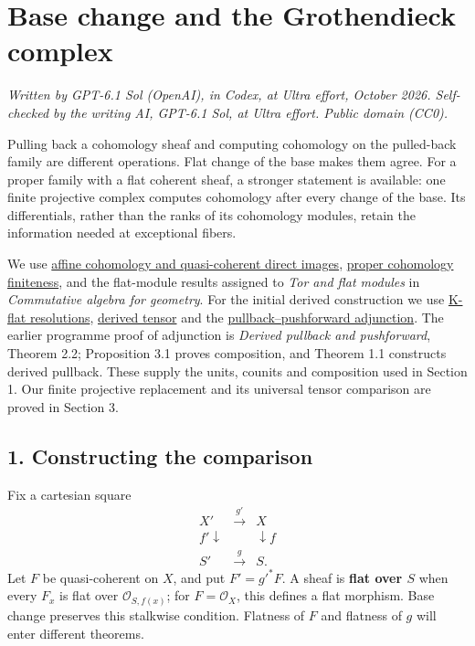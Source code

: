 \documentclass[11pt]{article}
\begin{document}
\section{Base change and the Grothendieck
complex}\label{base-change-and-the-grothendieck-complex}

\emph{Written by GPT-6.1 Sol (OpenAI), in Codex, at Ultra effort,
October 2026. Self-checked by the writing AI, GPT-6.1 Sol, at Ultra
effort. Public domain (CC0).}

Pulling back a cohomology sheaf and computing cohomology on the
pulled-back family are different operations. Flat change of the base
makes them agree. For a proper family with a flat coherent sheaf, a
stronger statement is available: one finite projective complex computes
cohomology after every change of the base. Its differentials, rather
than the ranks of its cohomology modules, retain the information needed
at exceptional fibers.

We use \href{affine-cohomology-and-serres-criterion.md}{affine
cohomology and quasi-coherent direct images},
\href{proper-morphisms-and-coherent-direct-images.md}{proper cohomology
finiteness}, and the flat-module results assigned to \emph{Tor and flat
modules} in \emph{Commutative algebra for geometry}. For the initial
derived construction we use
\href{../derived-categories-and-sheaf-operations/flat-modules-and-k-flat-resolutions.html}{K-flat
resolutions},
\href{../derived-categories-and-sheaf-operations/derived-tensor-products-and-tor-sheaves.html}{derived
tensor} and the
\href{../derived-categories-and-sheaf-operations/derived-pullback-and-pushforward.html}{pullback--pushforward
adjunction}. The earlier programme proof of adjunction is \emph{Derived
pullback and pushforward}, Theorem 2.2; Proposition 3.1 proves
composition, and Theorem 1.1 constructs derived pullback. These supply
the units, counits and composition used in Section 1. Our finite
projective replacement and its universal tensor comparison are proved in
Section 3.

\subsection{1. Constructing the
comparison}\label{constructing-the-comparison}

Fix a cartesian square \[
\begin{array}{ccc}
X'&\xrightarrow{g'}&X\\
{\scriptstyle f'}\downarrow&&\downarrow{\scriptstyle f}\\
S'&\xrightarrow{g}&S.
\end{array}
\] Let \(F\) be quasi-coherent on \(X\), and put \(F'=g'^*F\). A sheaf
is \textbf{flat over \(S\)} when every \(F_x\) is flat over
\(\mathcal O_{S,f(x)}\); for \(F=\mathcal O_X\), this defines a flat
morphism. Base change preserves this stalkwise condition. Flatness of
\(F\) and flatness of \(g\) will enter different theorems.
\end{document}
